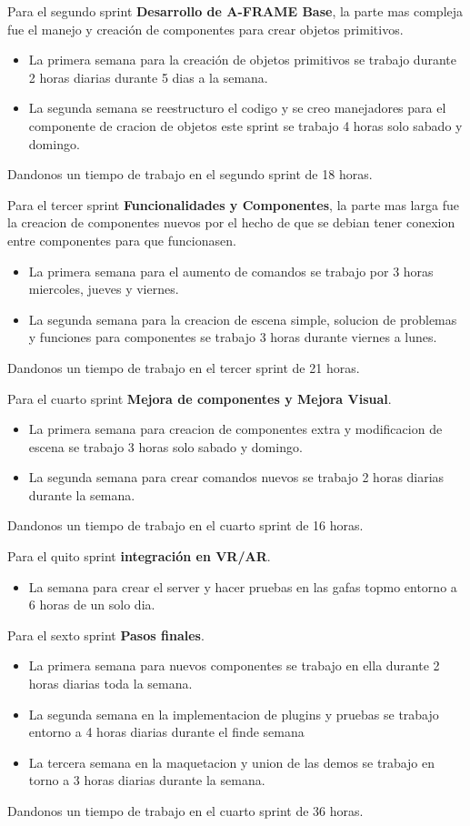 \documentclass[a4paper, 12pt]{book}
\begin{document}
Para el segundo sprint \textbf{Desarrollo de A-FRAME Base}, la parte mas compleja fue el manejo y creación de componentes para crear objetos primitivos.
\begin{itemize}
  \item La primera semana para la creación de objetos primitivos se trabajo durante 2 horas diarias durante 5 dias a la semana.
  \item La segunda semana se reestructuro el codigo y se creo manejadores para el componente de cracion de objetos este sprint se trabajo 4 horas solo sabado y domingo.
\end{itemize}
Dandonos un tiempo de trabajo en el segundo sprint de 18 horas.

Para el tercer sprint \textbf{Funcionalidades y Componentes}, la parte mas larga fue la creacion de componentes nuevos por el hecho de que se debian tener conexion entre componentes para que funcionasen.
\begin{itemize}
  \item La primera semana para el aumento de comandos se trabajo por 3 horas miercoles, jueves y viernes.
  \item La segunda semana para la creacion de escena simple, solucion de problemas y funciones para componentes se trabajo 3 horas durante viernes a lunes.
\end{itemize}
Dandonos un tiempo de trabajo en el tercer sprint de 21 horas.

Para el cuarto sprint \textbf{Mejora de componentes y Mejora Visual}.
\begin{itemize}
  \item La primera semana para creacion de componentes extra y modificacion de escena se trabajo 3 horas solo sabado y domingo.
  \item La segunda semana para crear comandos nuevos se trabajo 2 horas diarias durante la semana.
\end{itemize}
Dandonos un tiempo de trabajo en el cuarto sprint de 16 horas.

Para el quito sprint \textbf{integración en VR/AR}.
\begin{itemize}
  \item La semana para crear el server y hacer pruebas en las gafas topmo entorno a 6 horas de un solo dia.
\end{itemize}

Para el sexto sprint \textbf{Pasos finales}.
\begin{itemize}
  \item La primera semana para nuevos componentes se trabajo en ella durante 2 horas diarias toda la semana.
  \item La segunda semana en la implementacion de plugins y pruebas se trabajo entorno a 4 horas diarias durante el finde semana
  \item La tercera semana en la maquetacion y union de las demos se trabajo en torno a 3 horas diarias durante la semana.
\end{itemize}
Dandonos un tiempo de trabajo en el cuarto sprint de 36 horas.
\end{document}
